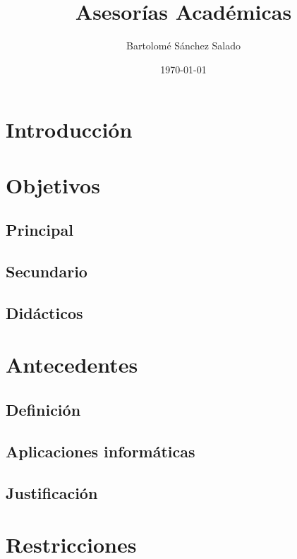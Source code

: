 \documentclass[a4paper,10pt,draft]{article}
\author{Bartolomé Sánchez Salado}
\title{Asesorías Académicas}
\date{\today}
\begin{document}
   \begin{titlepage}
      \maketitle
   \end{titlepage}

   \tableofcontents
   \newpage

   \section{Introducción}
      
      
      

   \section{Objetivos}
      \subsection{Principal}
      \subsection{Secundario}
      \subsection{Didácticos}

   \section{Antecedentes}
      \subsection{Definición}
      \subsection{Aplicaciones informáticas}
      \subsection{Justificación}

   \section{Restricciones}
\end{document}

